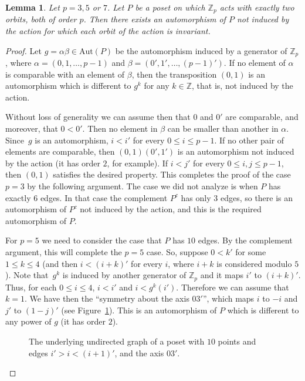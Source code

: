 \documentclass[10pt,a4paper]{amsart}
\newcommand{\Z}{\mathbb{Z}}
\newcommand{\aut}{\textrm{Aut}}
\theoremstyle{plain}
\newtheorem{lema}[cdrthm]{Lemma}
\theoremstyle{definition}
\theoremstyle{remark}
\begin{document}
\begin{lema} \label{nuevofacil}
Let $p=3,5$ or $7$. Let $P$ be a poset on which $\Z_p$ acts with exactly two orbits, both of order $p$. Then there exists an automorphism of $P$ not induced by the action for which each orbit of the action is invariant.
\end{lema}

\begin{proof}
Let $g=\alpha \beta \in \aut(P)$ be the automorphism induced by a generator of $\Z_p$, where $\alpha=(0,1,\ldots, p-1)$ and $\beta=(0',1',\ldots, (p-1)')$. If no element of $\alpha$ is comparable with an element of $\beta$, then the transposition $(0,1)$ is an automorphism which is different to $g^k$ for any $k\in \Z$, that is, not induced by the action.

Without loss of generality we can assume then that $0$ and $0'$ are comparable, and moreover, that $0<0'$. Then no element in $\beta$ can be smaller than another in $\alpha$. Since~$g$ is an automorphism, $i<i'$ for every $0\le i\le p-1$. If no other pair of elements are comparable, then $(0,1)(0',1')$ is an automorphism not induced by the action (it has order $2$, for example). If $i<j'$ for every $0\le i,j\le p-1$, then $(0,1)$ satisfies the desired property. This completes the proof of the case $p=3$ by the following argument. The case we did not analyze is when $P$ has exactly $6$ edges. In that case the complement $P^c$ has only $3$ edges, so there is an automorphism of $P^c$ not induced by the action, and this is the required automorphism of $P$.


For $p=5$ we need to consider the case that $P$ has $10$ edges. By the complement argument, this will complete the $p=5$ case. So, suppose $0<k'$ for some $1\le k\le 4$ (and then $i<(i+k)'$ for every $i$, where $i+k$ is considered modulo $5$). Note that~$g^k$ is induced by another generator of $\Z_p$ and it maps $i'$ to $(i+k)'$. Thus, for each $0\le i\le 4$, $i<i'$ and $i<g^k(i')$. Therefore we can assume that $k=1$. We have then the ``symmetry about the axis $03'$'', which maps $i$ to $-i$ and $j'$ to $(1-j)'$ (see Figure~\ref{figcinco}). This is an automorphism of $P$ which is different to any power of $g$ (it has order $2$).

\begin{figure}[h] 
\begin{center}


\caption{The underlying undirected graph of a poset with $10$ points and edges $i'>i<(i+1)'$, and the axis $03'$.}\label{figcinco}
\end{center}
\end{figure}


\end{proof}
\end{document}
